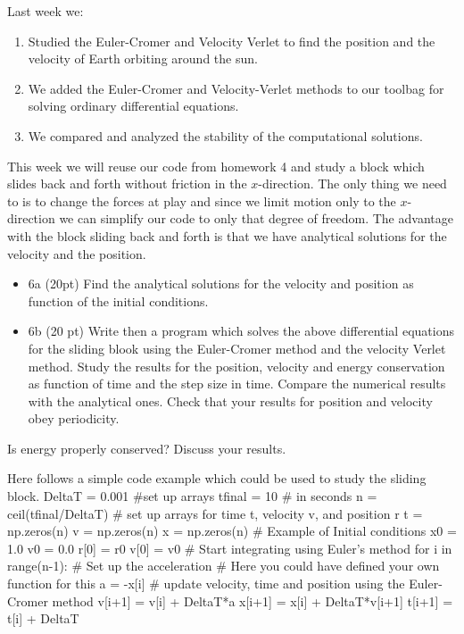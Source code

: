 \documentclass[%
oneside,                 %
final,                   %
10pt]{article}
\begin{document}
Last week we:
\begin{enumerate}
\item Studied  the Euler-Cromer and Velocity Verlet  to find the position and the velocity of  Earth orbiting around the sun.

\item We added the Euler-Cromer and Velocity-Verlet methods to our toolbag for solving ordinary differential equations.

\item We compared and analyzed the stability of the  computational solutions.
\end{enumerate}

\noindent
This week we will reuse our code from homework 4 and study a block
which slides back and forth without friction in the $x$-direction.
The only thing we need to is to change the forces at play and since we
limit motion only to the $x$-direction we can simplify our code to
only that degree of freedom.
The advantage with the block sliding back and forth is that we have analytical solutions for the velocity and the position. 


\begin{itemize}
\item 6a (20pt) Find the analytical solutions for the velocity and position as function of the initial conditions. 

\item 6b (20 pt)  Write then a program which solves the above differential equations for the sliding blook using the Euler-Cromer  method and the velocity Verlet method. Study the results for the position, velocity and energy conservation as function of time and the step size in time. Compare the numerical results with the analytical ones. Check that your results for position and velocity obey periodicity. 
\end{itemize}

\noindent
Is energy properly conserved? Discuss your results. 

Here follows a simple code example which could be used to study the sliding block.
\bpycod
DeltaT = 0.001
#set up arrays 
tfinal = 10 # in seconds
n = ceil(tfinal/DeltaT)
# set up arrays for time t, velocity v, and position r
t = np.zeros(n)
v = np.zeros(n)
x = np.zeros(n)
# Example of Initial conditions
x0 = 1.0
v0 = 0.0
r[0] = r0
v[0] = v0
# Start integrating using Euler's method
for i in range(n-1):
    # Set up the acceleration
    # Here you could have defined your own function for this
    a = -x[i]
    # update velocity, time and position using the Euler-Cromer method
    v[i+1] = v[i] + DeltaT*a
    x[i+1] = x[i] + DeltaT*v[i+1]
    t[i+1] = t[i] + DeltaT
\epycod
\end{document}
